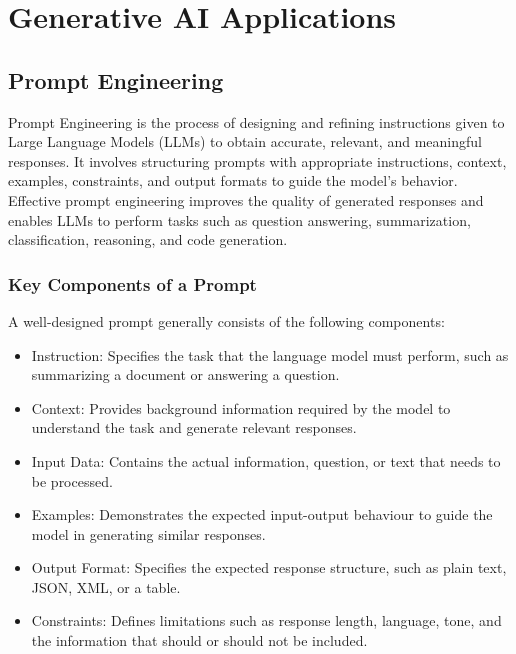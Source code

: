 \chapter{Generative AI Applications}

\section{Prompt Engineering}

Prompt Engineering is the process of designing and refining instructions given to Large Language Models (LLMs) to obtain accurate, relevant, and meaningful responses. It involves structuring prompts with appropriate instructions, context, examples, constraints, and output formats to guide the model's behavior. Effective prompt engineering improves the quality of generated responses and enables LLMs to perform tasks such as question answering, summarization, classification, reasoning, and code generation.

\subsection{Key Components of a Prompt}

A well-designed prompt generally consists of the following components:

\begin{itemize}
    \item Instruction: Specifies the task that the language model must perform, such as summarizing a document or answering a question.
    
    \item Context: Provides background information required by the model to understand the task and generate relevant responses.
    
    \item Input Data: Contains the actual information, question, or text that needs to be processed.
    
    \item Examples: Demonstrates the expected input-output behaviour to guide the model in generating similar responses.
    
    \item Output Format: Specifies the expected response structure, such as plain text, JSON, XML, or a table.
    
    \item Constraints: Defines limitations such as response length, language, tone, and the information that should or should not be included.
\end{itemize}


